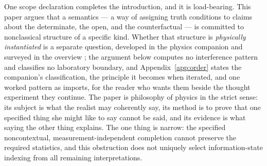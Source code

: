 One scope declaration completes the introduction, and it is load-bearing. This paper argues that a semantics --- a way of assigning truth conditions to claims about the determinate, the open, and the counterfactual --- is committed to nonclassical structure of a specific kind. Whether that structure is \emph{physically instantiated} is a separate question, developed in the physics companion and surveyed in the overview \cite{AethusQuant, AethusBrief}; the argument below computes no interference pattern and classifies no laboratory boundary, and Appendix~\ref{app:order} states the companion's classification, the principle it becomes when iterated, and one worked pattern as imports, for the reader who wants them beside the thought experiment they continue. The paper is philosophy of physics in the strict sense: its subject is what the realist may coherently say, its method is to prove that one specified thing she might like to say cannot be said, and its evidence is what saying the other thing explains. The one thing is narrow: the specified noncontextual, measurement-independent completion cannot preserve the required statistics, and this obstruction does not uniquely select information-state indexing from all remaining interpretations.

